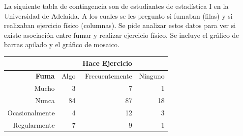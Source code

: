 \documentclass[11pt,evaluacion]{uescimat}
\begin{document}



\maketitle




\begin{problema}
La siguiente tabla de contingencia son de estudiantes de estadística I en la Universidad de Adelaida. A los cuales se les pregunto si fumaban (filas) y si realizaban ejercicio físico (columnas). Se pide analizar estos datos para ver si existe asociación entre fumar y realizar ejercicio físico. Se incluye el gráfico de barras apilado y el gráfico de mosaico. 

\begin{table}[H]
\centering
\begin{tabular}{rrrr}
\hline 
& & \textbf{Hace Ejercicio} & \\
  \hline
\textbf{Fuma} & Algo & Frecuentemente & Ninguno \\ 
  \hline
Mucho &   3 &   7 &   1 \\ 
  Nunca &  84 &  87 &  18 \\ 
  Ocasionalmente &   4 &  12 &   3 \\ 
  Regularmente &   7 &   9 &   1 \\ 
   \hline
\end{tabular}
\end{table}



\end{problema}
\end{document}

